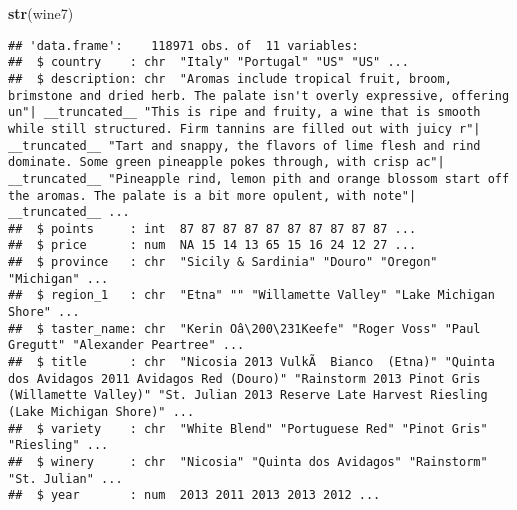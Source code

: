 \documentclass[
]{article}
\newenvironment{Shaded}{\begin{snugshade}}{\end{snugshade}}
\newcommand{\KeywordTok}[1]{\textcolor[rgb]{0.13,0.29,0.53}{\textbf{#1}}}
\newcommand{\NormalTok}[1]{#1}
\begin{document}
\begin{Shaded}
\begin{Highlighting}[]
\KeywordTok{str}\NormalTok{(wine7)}
\end{Highlighting}
\end{Shaded}

\begin{verbatim}
## 'data.frame':    118971 obs. of  11 variables:
##  $ country    : chr  "Italy" "Portugal" "US" "US" ...
##  $ description: chr  "Aromas include tropical fruit, broom, brimstone and dried herb. The palate isn't overly expressive, offering un"| __truncated__ "This is ripe and fruity, a wine that is smooth while still structured. Firm tannins are filled out with juicy r"| __truncated__ "Tart and snappy, the flavors of lime flesh and rind dominate. Some green pineapple pokes through, with crisp ac"| __truncated__ "Pineapple rind, lemon pith and orange blossom start off the aromas. The palate is a bit more opulent, with note"| __truncated__ ...
##  $ points     : int  87 87 87 87 87 87 87 87 87 87 ...
##  $ price      : num  NA 15 14 13 65 15 16 24 12 27 ...
##  $ province   : chr  "Sicily & Sardinia" "Douro" "Oregon" "Michigan" ...
##  $ region_1   : chr  "Etna" "" "Willamette Valley" "Lake Michigan Shore" ...
##  $ taster_name: chr  "Kerin Oâ\200\231Keefe" "Roger Voss" "Paul Gregutt" "Alexander Peartree" ...
##  $ title      : chr  "Nicosia 2013 VulkÃ  Bianco  (Etna)" "Quinta dos Avidagos 2011 Avidagos Red (Douro)" "Rainstorm 2013 Pinot Gris (Willamette Valley)" "St. Julian 2013 Reserve Late Harvest Riesling (Lake Michigan Shore)" ...
##  $ variety    : chr  "White Blend" "Portuguese Red" "Pinot Gris" "Riesling" ...
##  $ winery     : chr  "Nicosia" "Quinta dos Avidagos" "Rainstorm" "St. Julian" ...
##  $ year       : num  2013 2011 2013 2013 2012 ...
\end{verbatim}
\end{document}
